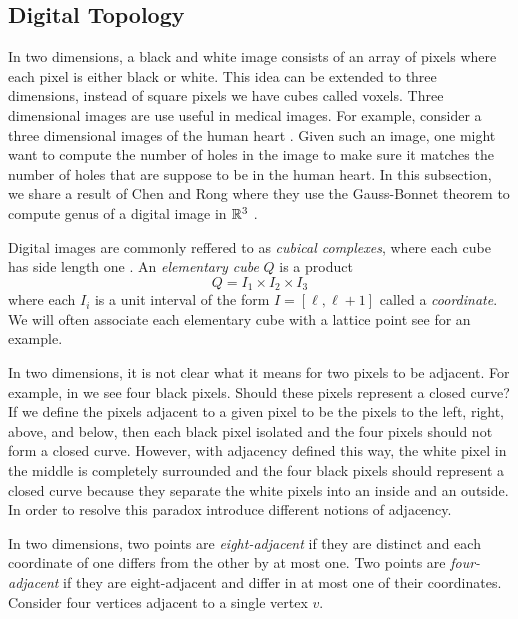 \subsection{Digital Topology}
\label{sec:digital-topology}

In two dimensions, a black and white image consists of an array of pixels
where each pixel is either black or white.
This idea can be extended to three dimensions,
instead of square pixels we have cubes called voxels.
Three dimensional images are use useful in medical images. 
For example,  consider a
three dimensional images of the human heart \cite{bovik_handbook_2000}.
Given such an image, one might want to compute
the number of holes in the image to make sure it
matches the number of holes that are suppose to be in
the human heart. In this subsection, we share a result
of Chen and Rong where they 
use the Gauss-Bonnet theorem to 
compute genus of a digital image in $\mathbb{R}^3$ \cite{chen_digital_2010}.


Digital images are commonly reffered to as \emph{cubical complexes},
where each cube has side length one \cite{kong_digital_1989}.
An \emph{elementary cube} $Q$ is a product
$$Q=I_1\times I_2 \times I_3$$
where each $I_i$ is a unit interval of the form $I=[\ell,\ell+1]$
called a \emph{coordinate}.
We will often associate each elementary cube with a lattice point
see  for an example.


In two dimensions, it is not clear what it means
for two pixels to be adjacent. For example, in 
we see four black pixels. Should these pixels represent a closed
curve? If we define the pixels adjacent to a given pixel to be the 
pixels to the left, right, above, and below, then each black pixel isolated
and the four pixels should not form a closed curve. However,
with adjacency defined this way, the white pixel in the middle is completely surrounded 
and the four black pixels should represent a closed curve because
they separate the white pixels into an inside and an outside.
In order to resolve this paradox introduce different notions of adjacency.


In two dimensions, two points are \emph{eight-adjacent}
if they are distinct and each coordinate of one differs from
the other by at most one.
Two points are \emph{four-adjacent} if
they are eight-adjacent and differ in at most one of their coordinates.
Consider four vertices adjacent to a single vertex $v$.

